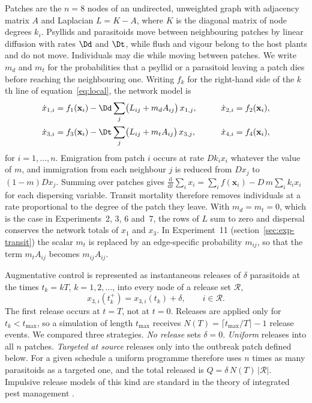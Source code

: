 Patches are the $n=8$ nodes of an undirected, unweighted graph with adjacency matrix $A$ and Laplacian $L = K - A$, where $K$ is the diagonal matrix of node degrees $k_i$. Psyllids and parasitoids move between neighbouring patches by linear diffusion with rates $\Dd$ and $\Dt$, while flush and vigour belong to the host plants and do not move. Individuals may die while moving between patches. We write $m_d$ and $m_t$ for the probabilities that a psyllid or a parasitoid leaving a patch dies before reaching the neighbouring one. Writing $f_k$ for the right-hand side of the $k$th line of equation~\eqref{eq:local}, the network model is
\begin{equation}
\begin{aligned}
\dot x_{1,i} &= f_1(\mathbf{x}_i) - \Dd\sum_{j} \bigl(L_{ij} + m_d A_{ij}\bigr)\,x_{1,j}, &\qquad \dot x_{2,i} &= f_2(\mathbf{x}_i),\\
\dot x_{3,i} &= f_3(\mathbf{x}_i) - \Dt\sum_{j} \bigl(L_{ij} + m_t A_{ij}\bigr)\,x_{3,j}, &\qquad \dot x_{4,i} &= f_4(\mathbf{x}_i),
\end{aligned}
\label{eq:network}
\end{equation}
for $i=1,\dots,n$. Emigration from patch $i$ occurs at rate $D k_i x_i$ whatever the value of $m$, and immigration from each neighbour $j$ is reduced from $D x_j$ to $(1-m)D x_j$. Summing over patches gives $\tfrac{\mathrm{d}}{\mathrm{d}t}\sum_i x_i = \sum_i f(\mathbf{x}_i) - D\,m\sum_i k_i x_i$ for each dispersing variable. Transit mortality therefore removes individuals at a rate proportional to the degree of the patch they leave. With $m_d = m_t = 0$, which is the case in Experiments~2, 3, 6 and~7, the rows of $L$ sum to zero and dispersal conserves the network totals of $x_1$ and $x_3$. In Experiment~11 (section~\ref{sec:exp-transit}) the scalar $m_t$ is replaced by an edge-specific probability $m_{ij}$, so that the term $m_t A_{ij}$ becomes $m_{ij}A_{ij}$.

Augmentative control is represented as instantaneous releases of $\delta$ parasitoids at the times $t_k = kT$, $k = 1,2,\dots$, into every node of a release set $\mathcal{R}$,
\begin{equation}
x_{3,i}(t_k^{+}) = x_{3,i}(t_k) + \delta,\qquad i\in\mathcal{R}.
\label{eq:impulse}
\end{equation}
The first release occurs at $t=T$, not at $t=0$. Releases are applied only for $t_k < t_{\max}$, so a simulation of length $t_{\max}$ receives $N(T) = \lceil t_{\max}/T\rceil - 1$ release events. We compared three strategies. \emph{No release} sets $\delta = 0$. \emph{Uniform} releases into all $n$ patches. \emph{Targeted at source} releases only into the outbreak patch defined below. For a given schedule a uniform programme therefore uses $n$ times as many parasitoids as a targeted one, and the total released is $Q = \delta\,N(T)\,|\mathcal{R}|$. Impulsive release models of this kind are standard in the theory of integrated pest management \citep{tang2008}.

